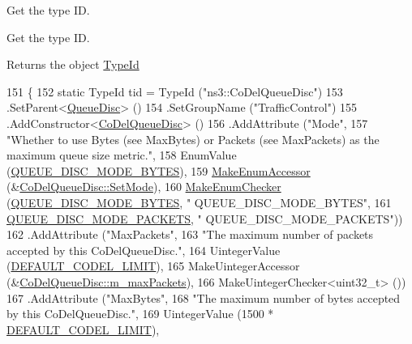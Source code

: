 Get the type ID. 

Get the type ID. \begin{DoxyReturn}{Returns}
the object \hyperlink{classns3_1_1TypeId}{Type\+Id} 
\end{DoxyReturn}

\begin{DoxyCode}
151 \{
152   \textcolor{keyword}{static} TypeId tid = TypeId (\textcolor{stringliteral}{"ns3::CoDelQueueDisc"})
153     .SetParent<\hyperlink{classns3_1_1QueueDisc_a0e328ad3196b7d16783b8680722381d6}{QueueDisc}> ()
154     .SetGroupName (\textcolor{stringliteral}{"TrafficControl"})
155     .AddConstructor<\hyperlink{classns3_1_1CoDelQueueDisc_ac43cda83c2fecc79ed4975d226c76b66}{CoDelQueueDisc}> ()
156     .AddAttribute (\textcolor{stringliteral}{"Mode"},
157                    \textcolor{stringliteral}{"Whether to use Bytes (see MaxBytes) or Packets (see MaxPackets) as the maximum queue
       size metric."},
158                    EnumValue (\hyperlink{classns3_1_1CoDelQueueDisc_a6149d83cd9f193b54b55efa7309b79ebaaae7bcc283fc6f666eb26c7d479d591a}{QUEUE\_DISC\_MODE\_BYTES}),
159                    \hyperlink{namespacens3_af5050739867ce63896dec011e332c8ec}{MakeEnumAccessor} (&\hyperlink{classns3_1_1CoDelQueueDisc_a5050122717a24bb94d82d807d4dd4a0e}{CoDelQueueDisc::SetMode}),
160                    \hyperlink{namespacens3_a48832781a2b521d3d0091e05ece30615}{MakeEnumChecker} (\hyperlink{classns3_1_1CoDelQueueDisc_a6149d83cd9f193b54b55efa7309b79ebaaae7bcc283fc6f666eb26c7d479d591a}{QUEUE\_DISC\_MODE\_BYTES}, \textcolor{stringliteral}{"
      QUEUE\_DISC\_MODE\_BYTES"},
161                                     \hyperlink{classns3_1_1CoDelQueueDisc_a6149d83cd9f193b54b55efa7309b79eba373e8cb28bf34e16cf0b9b1ed5aee5a0}{QUEUE\_DISC\_MODE\_PACKETS}, \textcolor{stringliteral}{"
      QUEUE\_DISC\_MODE\_PACKETS"}))
162     .AddAttribute (\textcolor{stringliteral}{"MaxPackets"},
163                    \textcolor{stringliteral}{"The maximum number of packets accepted by this CoDelQueueDisc."},
164                    UintegerValue (\hyperlink{codel-queue-disc_8h_abf0559f532fb7922a8d83feaccdfcfa6}{DEFAULT\_CODEL\_LIMIT}),
165                    MakeUintegerAccessor (&\hyperlink{classns3_1_1CoDelQueueDisc_a806f6d4be982deffa2369d21765ab7ae}{CoDelQueueDisc::m\_maxPackets}),
166                    MakeUintegerChecker<uint32\_t> ())
167     .AddAttribute (\textcolor{stringliteral}{"MaxBytes"},
168                    \textcolor{stringliteral}{"The maximum number of bytes accepted by this CoDelQueueDisc."},
169                    UintegerValue (1500 * \hyperlink{codel-queue-disc_8h_abf0559f532fb7922a8d83feaccdfcfa6}{DEFAULT\_CODEL\_LIMIT}),

\end{DoxyCode}
